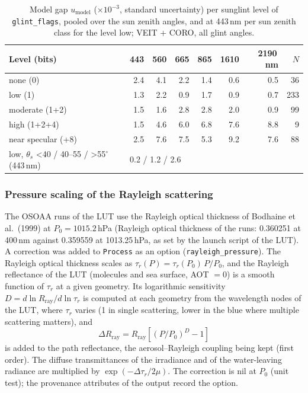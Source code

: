 \documentclass[11pt,a4paper]{article}
\newcommand{\code}[1]{\texttt{#1}}
\begin{document}
\begin{table}[h]
\centering\small
\caption{Model gap $u_\mathrm{model}$ ($\times10^{-3}$, standard uncertainty) per sunglint level of \code{glint\_flags},
pooled over the sun zenith angles, and at 443\,nm per sun zenith class for the level low; VEIT + CORO, all glint
angles.}
\label{tab:model_gap}
\begin{tabular}{lrrrrrrr}
\toprule
Level (bits) & 443 & 560 & 665 & 865 & 1610 & 2190\,nm & $N$ \\
\midrule
none (0)            & 2.4 & 4.1 & 2.2 & 1.4 & 0.6 & 0.5 & 36 \\
low (1)             & 1.3 & 2.2 & 0.9 & 1.7 & 0.9 & 0.7 & 233 \\
moderate (1+2)      & 1.5 & 1.6 & 2.8 & 2.8 & 2.0 & 0.9 & 99 \\
high (1+2+4)        & 1.5 & 4.6 & 6.0 & 6.8 & 7.6 & 8.8 & 9 \\
near specular (+8)  & 2.5 & 7.6 & 7.5 & 5.3 & 9.2 & 7.6 & 88 \\
\midrule
low, $\theta_s$ <40 / 40--55 / >55$^\circ$ (443\,nm) & \multicolumn{7}{l}{0.2 / 1.2 / 2.6} \\
\bottomrule
\end{tabular}
\end{table}

\subsubsection{Pressure scaling of the Rayleigh scattering}
\label{sec:pressure}
The OSOAA runs of the LUT use the Rayleigh optical thickness of Bodhaine et al.\ (1999) at $P_0 = 1015.2$\,hPa
(Rayleigh optical thickness of the runs: 0.360251 at 400\,nm against 0.359559 at 1013.25\,hPa, as set by the
launch script of the LUT). A correction was added to \code{Process} as an option (\code{rayleigh\_pressure}). The
Rayleigh optical thickness scales
as $\tau_r(P) = \tau_r(P_0)\,P/P_0$, and the Rayleigh reflectance of the LUT (molecules and sea surface, AOT $=0$) is a
smooth function of $\tau_r$ at a given geometry. Its logarithmic sensitivity $D = d\ln R_\mathrm{ray}/d\ln\tau_r$ is
computed at each geometry from the wavelength nodes of the LUT, where $\tau_r$ varies (1 in single scattering, lower
in the blue where multiple scattering matters), and
\begin{equation}
\Delta R_\mathrm{ray} = R_\mathrm{ray}\left[(P/P_0)^D - 1\right]
\end{equation}
is added to the path reflectance, the aerosol--Rayleigh coupling being kept (first order). The diffuse transmittances
of the irradiance and of the water-leaving radiance are multiplied by $\exp(-\Delta\tau_r/2\mu)$. The correction is nil
at $P_0$ (unit test); the provenance attributes of the output record the option.
\end{document}

